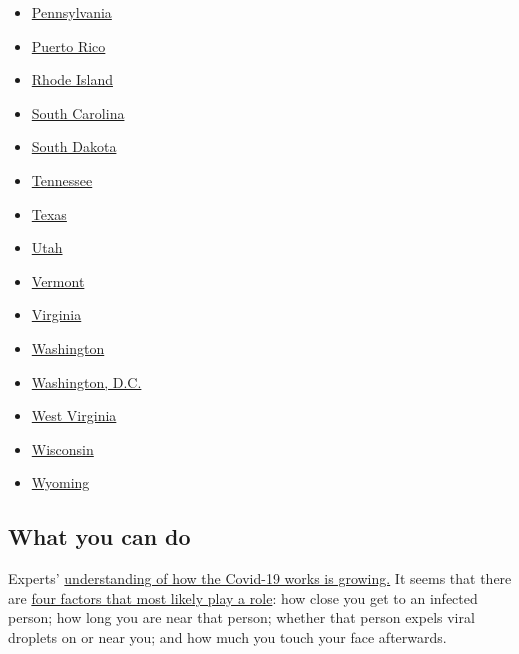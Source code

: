 \begin{itemize}
\item
  \href{https://www.nytimes.com/interactive/2020/us/pennsylvania-coronavirus-cases.html}{Pennsylvania}
\item
  \href{https://www.nytimes.com/interactive/2020/us/puerto-rico-coronavirus-cases.html}{Puerto
  Rico}
\item
  \href{https://www.nytimes.com/interactive/2020/us/rhode-island-coronavirus-cases.html}{Rhode
  Island}
\item
  \href{https://www.nytimes.com/interactive/2020/us/south-carolina-coronavirus-cases.html}{South
  Carolina}
\item
  \href{https://www.nytimes.com/interactive/2020/us/south-dakota-coronavirus-cases.html}{South
  Dakota}
\item
  \href{https://www.nytimes.com/interactive/2020/us/tennessee-coronavirus-cases.html}{Tennessee}
\item
  \href{https://www.nytimes.com/interactive/2020/us/texas-coronavirus-cases.html}{Texas}
\item
  \href{https://www.nytimes.com/interactive/2020/us/utah-coronavirus-cases.html}{Utah}
\item
  \href{https://www.nytimes.com/interactive/2020/us/vermont-coronavirus-cases.html}{Vermont}
\item
  \href{https://www.nytimes.com/interactive/2020/us/virginia-coronavirus-cases.html}{Virginia}
\item
  \href{https://www.nytimes.com/interactive/2020/us/washington-coronavirus-cases.html}{Washington}
\item
  \href{https://www.nytimes.com/interactive/2020/us/washington-dc-coronavirus-cases.html}{Washington,
  D.C.}
\item
  \href{https://www.nytimes.com/interactive/2020/us/west-virginia-coronavirus-cases.html}{West
  Virginia}
\item
  \href{https://www.nytimes.com/interactive/2020/us/wisconsin-coronavirus-cases.html}{Wisconsin}
\item
  \href{https://www.nytimes.com/interactive/2020/us/wyoming-coronavirus-cases.html}{Wyoming}
\end{itemize}

\hypertarget{what-you-can-do}{%
\subsection{What you can do}\label{what-you-can-do}}

Experts'
\href{https://www.nytimes.com/2020/06/02/health/coronavirus-profile-covid.html}{understanding
of how the Covid-19 works is growing.} It seems that there are
\href{https://www.nytimes.com/2020/03/02/health/coronavirus-how-it-spreads.html}{four
factors that most likely play a role}: how close you get to an infected
person; how long you are near that person; whether that person expels
viral droplets on or near you; and how much you touch your face
afterwards.

